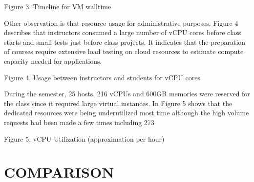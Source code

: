 \documentclass{sig-alternate}
\begin{document}
 
Figure 3. Timeline for VM walltime

Other observation is that resource usage for administrative purposes. Figure 4 describes that instructors consumed a large number of vCPU cores before class starts and small tests just before class projects. It indicates that the preparation of courses require extensive load testing on cloud resources to estimate compute capacity needed for applications.

 
Figure 4. Usage between instructors and students for vCPU cores

During the semester, 25 hosts, 216 vCPUs and 600GB memories were reserved for the class since it required large virtual instances. In Figure 5 shows that the dedicated resources were being underutilized most time although the high volume requests had been made a few times including 273%
 
Figure 5. vCPU Utilization (approximation per hour)

\section{COMPARISON}

% 
\end{document}
